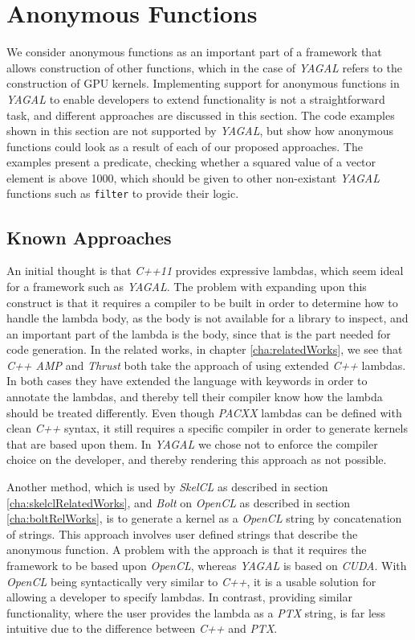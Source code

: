 \section{Anonymous Functions} \label{sec:lambdaProblem}
We consider anonymous functions as an important part of a framework that allows construction of other functions, which in the case of \textit{YAGAL} refers to the construction of GPU kernels. Implementing support for anonymous functions in \textit{YAGAL} to enable developers to extend functionality is not a straightforward task, and different approaches are discussed in this section. The code examples shown in this section are not supported by \textit{YAGAL}, but show how anonymous functions could look as a result of each of our proposed approaches. The examples present a predicate, checking whether a squared value of a vector element is above 1000, which should be given to other non-existant \textit{YAGAL} functions such as \texttt{filter} to provide their logic.

\subsection{Known Approaches}
An initial thought is that \textit{C++11} provides expressive lambdas, which seem ideal for a framework such as \textit{YAGAL}. The problem with expanding upon this construct is that it requires a compiler to be built in order to determine how to handle the lambda body, as the body is not available for a library to inspect\cite{cppLambdaRef}, and an important part of the lambda is the body, since that is the part needed for code generation. In the related works, in chapter \ref{cha:relatedWorks}, we see that \textit{C++ AMP} and \textit{Thrust} both take the approach of using extended \textit{C++} lambdas. In both cases they have extended the language with keywords in order to annotate the lambdas, and thereby tell their compiler know how the lambda should be treated differently. Even though \textit{PACXX} lambdas can be defined with clean \textit{C++} syntax, it still requires a specific compiler in order to generate kernels that are based upon them. In \textit{YAGAL} we chose not to enforce the compiler choice on the developer, and thereby rendering this approach as not possible.

Another method, which is used by \textit{SkelCL} as described in section \ref{cha:skelclRelatedWorks}, and \textit{Bolt} on \textit{OpenCL} as described in section \ref{cha:boltRelWorks}, is to generate a kernel as a \textit{OpenCL} string by concatenation of strings. This approach involves user defined strings that describe the anonymous function. A problem with the approach is that it requires the framework to be based upon \textit{OpenCL}, whereas \textit{YAGAL} is based on \textit{CUDA}. With \textit{OpenCL} being syntactically very similar to \textit{C++}, it is a usable solution for allowing a developer to specify lambdas. In contrast, providing similar functionality, where the user provides the lambda as a \textit{PTX} string, is far less intuitive due to the difference between \textit{C++} and \textit{PTX}.

